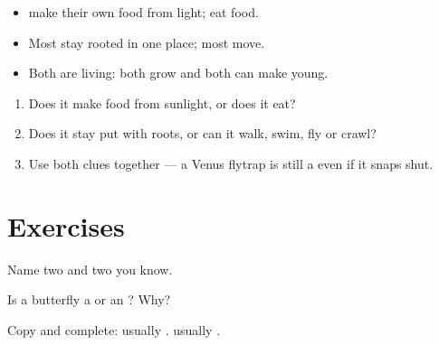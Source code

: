 \begin{proposition}\label{prop:g1:plants-animals:compare}
\begin{itemize}
  \item {} make their own food from light;  eat food.
  \item Most  stay rooted in one place; most  move.
  \item Both are living: both grow and both can make young.
\end{itemize}
\end{proposition}
\admitted

\begin{method}\label{met:g1:plants-animals:sort}
\begin{enumerate}
  \item Does it make food from sunlight, or does it eat?
  \item Does it stay put with roots, or can it walk, swim, fly or
        crawl?
  \item Use both clues together --- a Venus flytrap is still a
         even if it snaps shut.
\end{enumerate}
\end{method}

\section{Exercises}

\begin{exercise}[$\star$]\label{exo:g1:plants-animals:1}
Name two  and two  you know.
\end{exercise}

\begin{exercise}[$\star$]\label{exo:g1:plants-animals:2}
Is a butterfly a  or an ? Why?
\end{exercise}

\begin{exercise}[$\star$]\label{exo:g1:plants-animals:3}
Copy and complete:  usually \underline{\hspace{1.5cm}}.
 usually \underline{\hspace{1.5cm}}.
\end{exercise}

